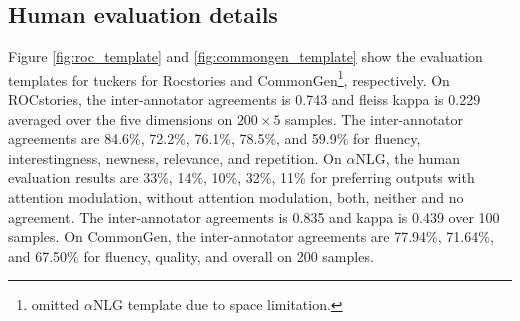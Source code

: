 \documentclass[11pt,a4paper]{article}
\newcommand{\alg}{attention modulation}
\begin{document}
 \subsection{Human evaluation details}
 Figure \ref{fig:roc_template} and \ref{fig:commongen_template} show the evaluation templates  for tuckers for Rocstories and CommonGen\footnote{omitted  $\alpha$NLG template due to space limitation.}, respectively. On ROCstories, the inter-annotator agreements is 0.743 and fleiss kappa is 0.229 averaged over the five dimensions on $200 \times 5$ samples. The inter-annotator agreements are 84.6\%, 72.2\%, 76.1\%, 78.5\%, and 59.9\% for fluency, interestingness, newness, relevance, and repetition. On $\alpha$NLG, the human evaluation results are 33\%, 14\%, 10\%, 32\%, 11\% for preferring outputs with \alg{}, without \alg{}, both, neither and no agreement. The inter-annotator agreements is 0.835 and kappa is 0.439 over 100 samples.
 On CommonGen, the inter-annotator agreements  are 77.94\%, 71.64\%, and 67.50\% for fluency, quality,  and overall on 200 samples.

\end{document}
